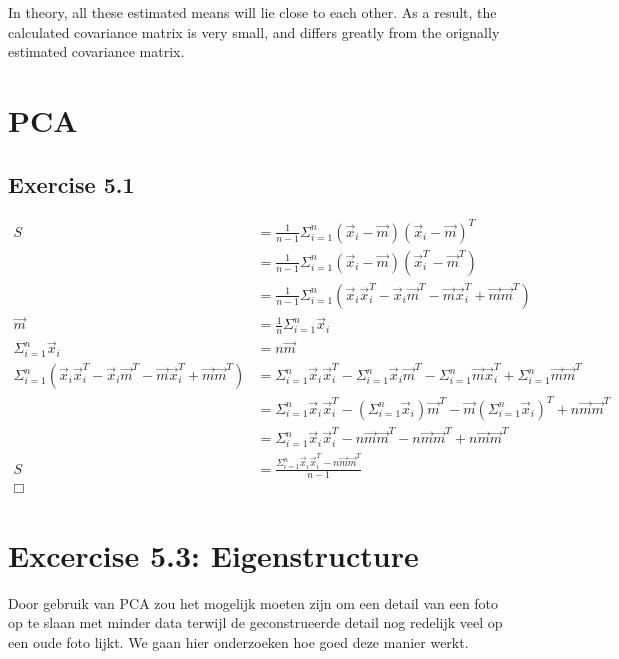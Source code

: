 \documentclass{article}
\begin{document}
\inputminted{text}{variance_22.txt}

In theory, all these estimated means will lie close to each other. As a result,
the calculated covariance matrix is very small, and differs greatly from the
orignally estimated covariance matrix.

\section{PCA}

\subsection{Exercise 5.1}

\begin{align*}
    S &= \frac1{n-1} \Sigma^n_{i=1} (\vec x_i - \vec m)(\vec x_i - \vec m)^T \\
      &= \frac1{n-1} \Sigma^n_{i=1} (\vec x_i - \vec m)(\vec x_i^T - \vec m^T)
    \\
      &= \frac1{n-1} \Sigma^n_{i=1} \left(\vec x_i \vec x_i^T - \vec x_i \vec
m^T - \vec m \vec x_i^T + \vec m \vec m ^T\right) \\
    \vec m &= \frac1n \Sigma^n_{i=1} \vec x_i \\
    \Sigma^n_{i=1} \vec x_i &= n \vec m \\
    \Sigma^n_{i=1} \left(\vec x_i \vec x_i^T - \vec x_i \vec m^T - \vec m \vec
    x_i^T + \vec m \vec m^T\right) &= \Sigma^n_{i=1} \vec x_i \vec x_i^T -
        \Sigma^n_{i=1} \vec x_i \vec m^T - \Sigma^n_{i=1} \vec m \vec
    x_i^T + \Sigma^n_{i=1} \vec m \vec m^T \\
    &= \Sigma^n_{i=1} \vec x_i \vec x_i^T - \left(\Sigma^n_{i=1} \vec x_i\right)
    \vec m^T - \vec m \left(\Sigma^n_{i=1} \vec x_i\right)^T + n \vec m \vec m^T
    \\
    &= \Sigma^n_{i=1} \vec x_i \vec x_i^T - n \vec m \vec m^T - n \vec m \vec
    m^T + n \vec m \vec m^T \\
    S &= \frac{\Sigma^n_{i=1} \vec x_i \vec x_i^T - n \vec m \vec m^T}{n-1} \\
    \Box
\end{align*}


\section{Excercise 5.3: Eigenstructure}
Door gebruik van PCA zou het mogelijk moeten zijn om een detail van een foto op
te slaan met minder data terwijl de geconstrueerde detail nog redelijk veel op
een oude foto lijkt. We gaan hier onderzoeken hoe goed deze manier werkt.
\end{document}
